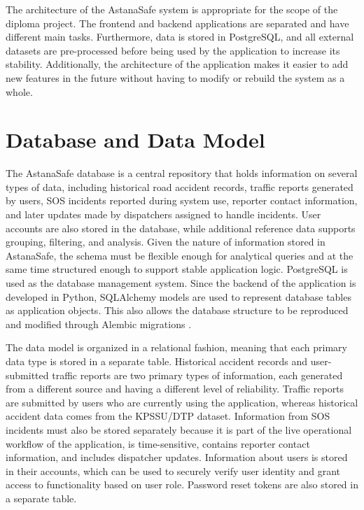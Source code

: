 ﻿\documentclass[12pt,a4paper]{report}
\begin{document}
The architecture of the AstanaSafe system is appropriate for the scope of the diploma project. The frontend and backend applications are separated and have different main tasks. Furthermore, data is stored in PostgreSQL, and all external datasets are pre-processed before being used by the application to increase its stability. Additionally, the architecture of the application makes it easier to add new features in the future without having to modify or rebuild the system as a whole.

\section{Database and Data Model}

The AstanaSafe database is a central repository that holds information on several types of data, including historical road accident records, traffic reports generated by users, SOS incidents reported during system use, reporter contact information, and later updates made by dispatchers assigned to handle incidents. User accounts are also stored in the database, while additional reference data supports grouping, filtering, and analysis. Given the nature of information stored in AstanaSafe, the schema must be flexible enough for analytical queries and at the same time structured enough to support stable application logic. PostgreSQL is used as the database management system. Since the backend of the application is developed in Python, SQLAlchemy models are used to represent database tables as application objects. This also allows the database structure to be reproduced and modified through Alembic migrations \cite{chen2012}.

The data model is organized in a relational fashion, meaning that each primary data type is stored in a separate table. Historical accident records and user-submitted traffic reports are two primary types of information, each generated from a different source and having a different level of reliability. Traffic reports are submitted by users who are currently using the application, whereas historical accident data comes from the KPSSU/DTP dataset. Information from SOS incidents must also be stored separately because it is part of the live operational workflow of the application, is time-sensitive, contains reporter contact information, and includes dispatcher updates. Information about users is stored in their accounts, which can be used to securely verify user identity and grant access to functionality based on user role. Password reset tokens are also stored in a separate table.
\end{document}
